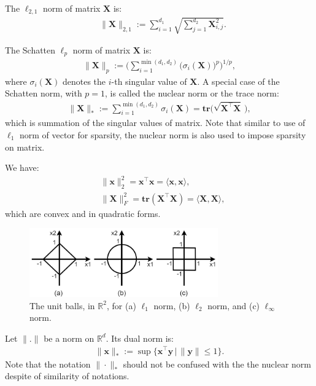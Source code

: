\documentclass[lang=cn,10pt]{gorgeousnbook}
\numberwithin{equation}{section}%
\numberwithin{figure}{section}%
\begin{document}
\begin{definition}[重要的范数]
The $\ell_{2,1}$ norm of matrix $\boldsymbol{X}$ is:
\begin{align*}
& \|\boldsymbol{X}\|_{2,1} := \sum_{i=1}^{d_1} \sqrt{\sum_{j=1}^{d_2} \boldsymbol{X}_{i,j}^2}.
\end{align*}

The Schatten $\ell_p$ norm of matrix $\boldsymbol{X}$ is:
\begin{align*}
\|\boldsymbol{X}\|_p := \bigg(\sum_{i=1}^{\min(d_1, d_2)} \big(\sigma_i(\boldsymbol{X})\big)^p\bigg)^{1/p},
\end{align*}
where $\sigma_i(\boldsymbol{X})$ denotes the $i$-th singular value of $\boldsymbol{X}$.
A special case of the Schatten norm, with $p=1$, is called the nuclear norm or the trace norm:
\begin{align*}
\|\boldsymbol{X}\|_* := \sum_{i=1}^{\min(d_1, d_2)} \sigma_i(\boldsymbol{X}) = \textbf{tr}\Big(\!\sqrt{\boldsymbol{X}^\top \boldsymbol{X}}\,\Big),
\end{align*}
which is summation of the singular values of matrix. 
Note that similar to use of $\ell_1$ norm of vector for sparsity, the nuclear norm is also used to impose sparsity on matrix. 
\end{definition}

\begin{lemma}
We have:
\begin{align*}
& \|\boldsymbol{x}\|_2^2 = \boldsymbol{x}^\top \boldsymbol{x} = \langle \boldsymbol{x}, \boldsymbol{x} \rangle, \\
& \|\boldsymbol{X}\|_F^2 = \textbf{tr}(\boldsymbol{X}^\top \boldsymbol{X}) = \langle \boldsymbol{X}, \boldsymbol{X} \rangle, 
\end{align*}
which are convex and in quadratic forms. 
\end{lemma}

\begin{figure}[!t]
\centering
\includegraphics[width=3.2in]{./images/unit_balls}
\caption{The unit balls, in $\mathbb{R}^2$, for (a) $\ell_1$ norm, (b) $\ell_2$ norm, and (c) $\ell_\infty$ norm.}
\label{figure_unit_balls}
\end{figure}

\begin{definition}
Let $\|.\|$ be a norm on $\mathbb{R}^d$. Its dual norm is:
\begin{align}
\|\boldsymbol{x}\|_* := \sup\{\boldsymbol{x}^\top \boldsymbol{y}\, |\, \|\boldsymbol{y}\| \leq 1\}. 
\end{align}
Note that the notation $\|\cdot\|_*$ should not be confused with the the nuclear norm despite of similarity of notations.
\end{definition}
\end{document}
